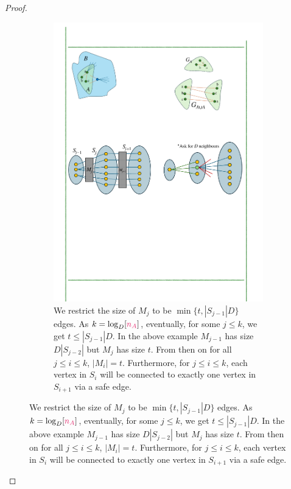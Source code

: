 \documentclass[11pt]{article}
\newcommand{\na}{\textcolor{razzmatazz}{n_A}}
\begin{document}
\begin{proof}
\begin{figure}[t!]
\begin{subfigure}[t]{0.95\textwidth}
        \label{subfig:embeddingA}
    \end{subfigure}%
    \hspace{1mm}
    \hspace{1mm}
    \begin{subfigure}[t]{0.95\textwidth}
        \centering
        \includegraphics[]{assets/embeddingB.pdf}
        \caption{We restrict the size of $M_j$ to be $\min\{t, |S_{j-1}|D\}$ edges. As $k = \log_{D}[\na]$, eventually, for some $j \leq k$, we get $t \leq |S_{j-1}|D$.
        In the above example $M_{j-1}$ has size $D|S_{j-2}|$ but $M_j$ has size $t$. 
        From then on for all $j \leq i \leq k$, $|M_i|= t$.
        Furthermore, for $j \leq i \leq k$,  each vertex in $S_i$ will be connected to exactly one vertex in $S_{i+1}$ via a safe edge.
        }
        \label{subfig:embeddingB}        
    \end{subfigure}
\end{figure}



\end{proof}
\end{document}
